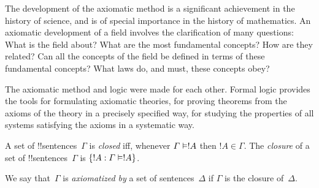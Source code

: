 \documentclass[../../../include/open-logic-section]{subfiles}
\begin{document}

\begin{explain}
The development of the axiomatic method is a significant achievement
in the history of science, and is of special importance in the history
of mathematics.  An axiomatic development of a field involves the
clarification of many questions: What is the field about?  What are the
most fundamental concepts?  How are they related?  Can all the
concepts of the field be defined in terms of these fundamental
concepts?  What laws do, and must, these concepts obey?

The axiomatic method and logic were made for each other.  Formal logic
provides the tools for formulating axiomatic theories, for proving
theorems from the axioms of the theory in a precisely specified way,
for studying the properties of all systems satisfying the axioms in a
systematic way.
\end{explain}

\begin{defn}
A set of !!{sentence}s~$\Gamma$ is \emph{closed} iff, whenever
$\Gamma \Entails !A$ then $!A \in \Gamma$.  The \emph{closure} of a set
of !!{sentence}s~$\Gamma$ is $\Setabs{!A}{\Gamma \Entails !A}$.

We say that~$\Gamma$ is \emph{axiomatized by} a set of
sentences~$\Delta$ if $\Gamma$ is the closure of~$\Delta$.
\end{defn}
\end{document}

